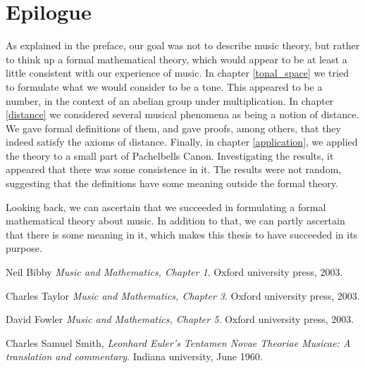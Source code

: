 \documentclass[a4paper]{book}
\theoremstyle{definition}
\begin{document}
\chapter*{Epilogue}
As explained in the preface, our goal was not to describe music theory, but rather to think up a formal mathematical theory, which would appear to be at least a little consistent with our experience of music.
In chapter \ref{tonal_space} we tried to formulate what we would consider to be a tone.
This appeared to be a number, in the context of an abelian group under multiplication.
In chapter \ref{distance} we considered several musical phenomena as being a notion of distance.
We gave formal definitions of them, and gave proofs, among others, that they indeed satisfy the axioms of distance.
Finally, in chapter \ref{application}, we applied the theory to a small part of Pachelbells Canon.
Investigating the results, it appeared that there was some consistence in it.
The results were not random, suggesting that the definitions have some meaning outside the formal theory.

Looking back, we can ascertain that we succeeded in formulating a formal mathematical theory about music.
In addition to that, we can partly ascertain that there is some meaning in it, which makes this thesis to have succeeded in its purpose.


\begin{thebibliography}{9}

        Neil Bibby
        \emph{Music and Mathematics, Chapter 1}.
        Oxford university press,
        2003.

        Charles Taylor
        \emph{Music and Mathematics, Chapter 3}.
        Oxford university press,
        2003.

        David Fowler
        \emph{Music and Mathematics, Chapter 5}.
        Oxford university press,
        2003.


        Charles Samuel Smith,
        \emph{Leonhard Euler's Tentamen Novae Theoriae Musicae: A translation and commentary}.
        Indiana university,
        June 1960.

\end{thebibliography}
\end{document}
